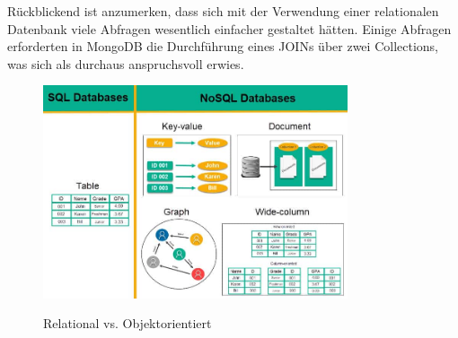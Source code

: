 \newline
Rückblickend ist anzumerken, dass sich mit der Verwendung einer relationalen Datenbank viele Abfragen wesentlich einfacher gestaltet hätten. Einige Abfragen erforderten in MongoDB die Durchführung eines JOINs über zwei Collections, was sich als durchaus anspruchsvoll erwies.
\cite{database_relational}
\newline
\begin{figure}[h!]
  \centering
  \includegraphics[width=0.8\textwidth]{pics/database-types.jpg}
  \caption{Relational vs. Objektorientiert}
  \cite{database_types}
\end{figure}